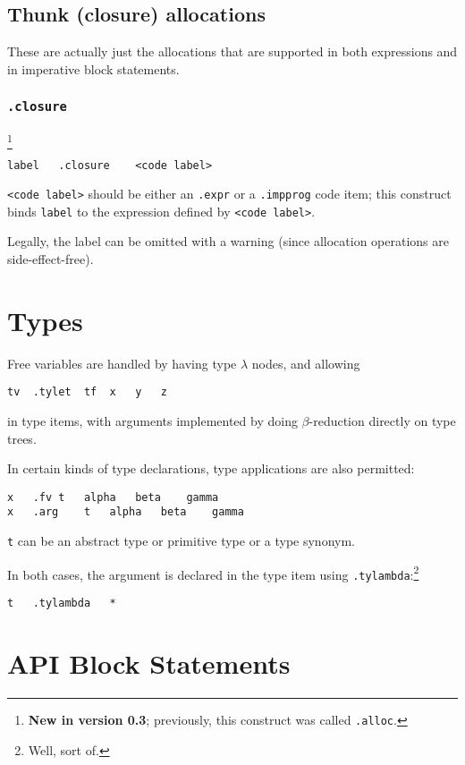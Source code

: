 \documentclass{report}
\newcommand\stringcode[1]{\texttt{#1}}
\newcommand\new[2]{\footnote{\textbf{New in version #1}; previously, #2}}
\begin{document}
\section{Thunk (closure) allocations}
\label{thunk_alloc}

These are actually just the allocations that are supported in both expressions and in imperative block statements.

\subsection{\stringcode{.closure}}
\new{0.3}{this construct was called \stringcode{.alloc}.}

\begin{verbatim}
label	.closure	<code label>
\end{verbatim}

\stringcode{<code label>} should be either an \stringcode{.expr} or a \stringcode{.impprog} code item;
this construct binds \stringcode{label} to the expression defined by \stringcode{<code label>}.

Legally, the label can be omitted with a warning (since allocation operations are side-effect-free).

\chapter{Types}

Free variables are handled by having type $\lambda$ nodes, and allowing
\begin{verbatim}
tv	.tylet	tf	x	y	z
\end{verbatim}
in type items, with arguments implemented by doing $\beta$-reduction directly on type trees.

In certain kinds of type declarations, type applications are also permitted:
\begin{verbatim}
x	.fv	t	alpha	beta	gamma
x	.arg	t	alpha	beta	gamma
\end{verbatim}
\verb+t+ can be an abstract type or primitive type or a type synonym.

In both cases, the argument is declared in the type item using \verb+.tylambda+:\footnote{Well, sort of.}
\begin{verbatim}
t	.tylambda	*
\end{verbatim}

\chapter{API Block Statements}
\end{document}
